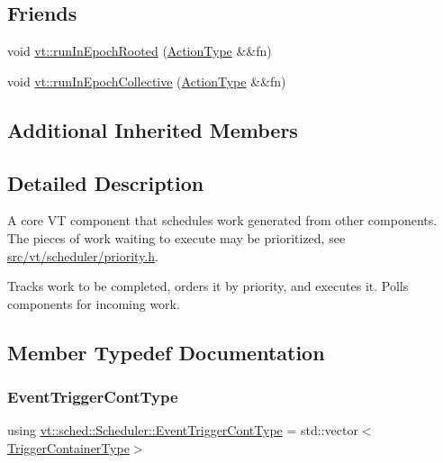 \subsection*{Friends}
\begin{DoxyCompactItemize}
\item 
void \hyperlink{structvt_1_1sched_1_1_scheduler_a915d5c24603b0f28e812e95106d2ca09}{vt\+::run\+In\+Epoch\+Rooted} (\hyperlink{namespacevt_ae0a5a7b18cc99d7b732cb4d44f46b0f3}{Action\+Type} \&\&fn)
\item 
void \hyperlink{structvt_1_1sched_1_1_scheduler_a1724d1352c428bcb2bfc5a32a6a27404}{vt\+::run\+In\+Epoch\+Collective} (\hyperlink{namespacevt_ae0a5a7b18cc99d7b732cb4d44f46b0f3}{Action\+Type} \&\&fn)
\end{DoxyCompactItemize}
\subsection*{Additional Inherited Members}


\subsection{Detailed Description}
A core VT component that schedules work generated from other components. The pieces of work waiting to execute may be prioritized, see \hyperlink{priority_8h}{src/vt/scheduler/priority.\+h}. 

Tracks work to be completed, orders it by priority, and executes it. Polls components for incoming work. 

\subsection{Member Typedef Documentation}
\mbox{\label{structvt_1_1sched_1_1_scheduler_a68203230dc48285d3d50bbb363ed267b}} 
\subsubsection{\texorpdfstring{Event\+Trigger\+Cont\+Type}{EventTriggerContType}}
{\footnotesize\ttfamily using \hyperlink{structvt_1_1sched_1_1_scheduler_a68203230dc48285d3d50bbb363ed267b}{vt\+::sched\+::\+Scheduler\+::\+Event\+Trigger\+Cont\+Type} =  std\+::vector$<$\hyperlink{structvt_1_1sched_1_1_scheduler_a0b9fe2a5ee31ca84fa52764a126ad666}{Trigger\+Container\+Type}$>$}

